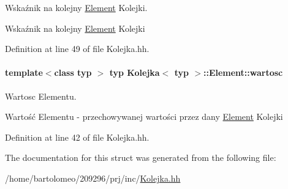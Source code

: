 Wskaźnik na kolejny \hyperlink{struct_kolejka_1_1_element}{Element} Kolejki. 

Wskaźnik na kolejny \hyperlink{struct_kolejka_1_1_element}{Element} Kolejki 

Definition at line 49 of file Kolejka.\-hh.

\hypertarget{struct_kolejka_1_1_element_a7d1b953f68cab0595bc8135004e0e976}{
\paragraph[{wartosc}]{\setlength{\rightskip}{0pt plus 5cm}template$<$class typ $>$ typ {\bf Kolejka}$<$ typ $>$\-::Element\-::wartosc}}\label{struct_kolejka_1_1_element_a7d1b953f68cab0595bc8135004e0e976}


Wartosc Elementu. 

Wartość Elementu -\/ przechowywanej wartości przez dany \hyperlink{struct_kolejka_1_1_element}{Element} Kolejki 

Definition at line 42 of file Kolejka.\-hh.



The documentation for this struct was generated from the following file\-:\begin{DoxyCompactItemize}
\item 
/home/bartolomeo/209296/prj/inc/\hyperlink{_kolejka_8hh}{Kolejka.\-hh}\end{DoxyCompactItemize}
